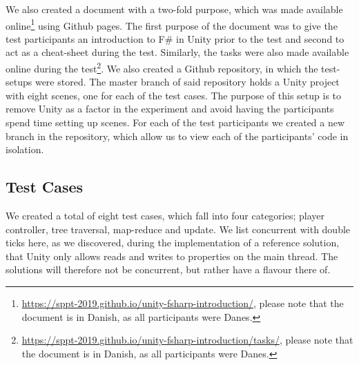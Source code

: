 We also created a document with a two-fold purpose, which was made available online\footnote{\url{https://sppt-2019.github.io/unity-fsharp-introduction/}, please note that the document is in Danish, as all participants were Danes.} using Github pages. The first purpose of the document was to give the test participants an introduction to F\# in Unity prior to the test and second to act as a cheat-sheet during the test. Similarly, the tasks were also made available online during the test\footnote{\url{https://sppt-2019.github.io/unity-fsharp-introduction/tasks/}, please note that the document is in Danish, as all participants were Danes.}. We also created a Github repository, in which the test-setups were stored. The master branch of said repository holds a Unity project with eight scenes, one for each of the test cases. The purpose of this setup is to remove Unity as a factor in the experiment and avoid having the participants spend time setting up scenes. For each of the test participants we created a new branch in the repository, which allow us to view each of the participants' code in isolation.
 
\subsection{Test Cases}
We created a total of eight test cases, which fall into four categories; player controller, tree traversal, map-reduce and  update. We list concurrent with double ticks here, as we discovered, during the implementation of a reference solution, that Unity only allows reads and writes to  properties on the main thread. The solutions will therefore not be concurrent, but rather have a flavour there of.

